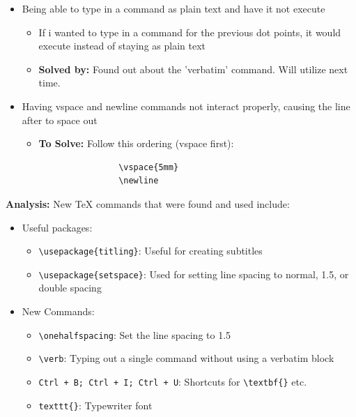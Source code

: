 \documentclass{article}
\begin{document}
\begin{itemize}
\begin{itemize}
        \item \textbf{Solved by:} checking where I have incorrectly used a double backslash or newline. Error went away
    \end{itemize}
    \item Being able to type in a command as plain text and have it not execute
        \begin{itemize}
            \item If i wanted to type in a command for the previous dot points, it would execute instead of staying as plain text
            \item \textbf{Solved by:} Found out about the 'verbatim' command. Will utilize next time.
        \end{itemize}
    \item Having vspace and newline commands not interact properly, causing the line after to space out
        \begin{itemize}
            \item \textbf{To Solve:} Follow this ordering (vspace first):
            \begin{verbatim}
                \vspace{5mm}
                \newline
            \end{verbatim}
        \end{itemize}
\end{itemize}
\textbf{Analysis:} New TeX commands that were found and used include:
    \begin{itemize}
        \item Useful packages:
        \begin{itemize}
            \item \verb|\usepackage{titling}|: Useful for creating subtitles
            \item \verb|\usepackage{setspace}|: Used for setting line spacing to normal, 1.5, or double spacing
        \end{itemize}
        \item New Commands:
        \begin{itemize}
            \item \verb|\onehalfspacing|: Set the line spacing to 1.5
            \item \verb|\verb|: Typing out a single command without using a verbatim block
            \item \texttt{Ctrl + B; Ctrl + I; Ctrl + U}: Shortcuts for \verb|\textbf{}| etc.
            \item \verb|texttt{}|: Typewriter font
        \end{itemize}
    \end{itemize}
\end{document}
